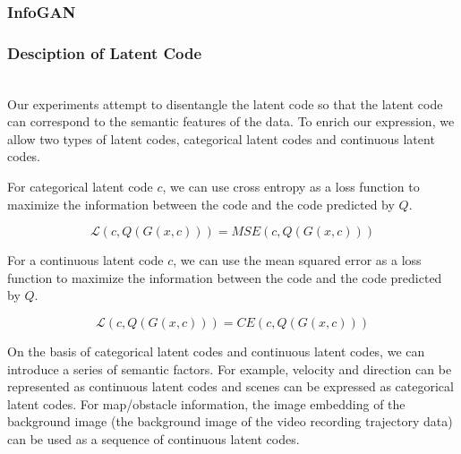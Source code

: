 \subsubsection{InfoGAN}


\subsubsection{Desciption of Latent Code}

\hfill \\
Our experiments attempt to disentangle the latent code so that the latent code can correspond to the semantic features of the data. To enrich our expression, we allow two types of latent codes, categorical latent codes and continuous latent codes.

For categorical latent code $c$, we can use cross entropy as a loss function to maximize the information between the code and the code predicted by $Q$.


$$\mathcal{L} (c, Q(G(x, c))) = MSE(c, Q(G(x, c))) $$

For a continuous latent code $c$, we can use the mean squared error as a loss function to maximize the information between the code and the code predicted by $Q$.

$$\mathcal{L} (c, Q(G(x, c))) = CE(c, Q(G(x, c))) $$

On the basis of categorical latent codes and continuous latent codes, we can introduce a series of semantic factors. For example, velocity and direction can be represented as continuous latent codes and scenes can be expressed as categorical latent codes. For map/obstacle information, the image embedding of the background image (the background image of the video recording trajectory data) can be used as a sequence of continuous latent codes.